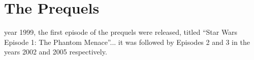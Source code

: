 
\part{The Prequels}
	\label{part:prequels}%



 year 1999, the first episode of the prequels were released, titled ``Star Wars Episode 1: The Phantom Menace''... it was followed by Episodes 2 and 3 in the years 2002 and 2005 respectively.



